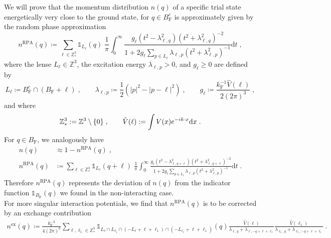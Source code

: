 \documentclass[12pt,a4paper]{article}
\numberwithin{equation}{section}
\newcommand{\1}{\mathbb{I}}
\newcommand{\di}{\textnormal{d}}
\newcommand{\ex}{\mathrm{ex}}
\newcommand{\F}{\mathrm{F}}
\newcommand{\RPA}{\mathrm{RPA}}
\newcommand{\Z}{\mathbb{Z}}
\newcommand{\half}{\frac{1}{2}}
\theoremstyle{plain}
\theoremstyle{definition}
\theoremstyle{remark}
\theoremstyle{plain}
\theoremstyle{definition}
\theoremstyle{remark}
\begin{document}
We will prove that the momentum distribution $ n(q) $ of a specific trial state energetically very close to the ground state, for $ q \in B_{\F}^c $ is approximately given by the random phase approximation
\begin{equation} \label{eq:nqb}
	n^{\RPA}(q)
	\coloneq \sum_{\ell \in \Z^3_*}\mathds{1}_{L_{\ell}}(q) \; \frac{1}{\pi}\int_0^\infty \frac{g_\ell (t^2-\lambda^2_{\ell,q}) (t^2 + \lambda^2_{\ell,q})^{-2}}{1 + 2g_\ell \sum_{p \in L_{\ell}}\lambda_{\ell,p} (t^2+\lambda^2_{\ell,p})^{-1}} \mathrm{d}t \;,
\end{equation}
where the lense $ L_\ell \in \Z^3 $, the excitation energy $ \lambda_{\ell,p} > 0 $, and $ g_\ell \ge 0 $ are defined by
\begin{equation} \label{eq:Lell}
	L_\ell \coloneq B_{\F}^c \cap (B_{\F} + \ell) \;, \qquad
	\lambda_{\ell,p} \coloneq \half (|p|^2 - |p-\ell|^2) \;, \qquad
	g_\ell \coloneq \frac{k_{\F}^{-1} \hat{V}(\ell) }{2 (2 \pi)^3} \;,
\end{equation}
and where \todo{Do we need $\Z^3_*$? Anyway $L_0 = \emptyset$.}
\begin{equation} \label{eq:Fourierconvention}
	\Z^3_* := \Z^3 \setminus \{0\} \;, \qquad
	\hat{V}(\ell) := \int V(x) e^{-i k \cdot x} \di x \;.
\end{equation}
For $ q \in B_{\F} $, we analogously have
\begin{equation}\label{eq:inside}
\begin{split}
	n(q) & \approx 1 - n^{\RPA}(q) \;, \\
	n^{\RPA}(q) & 	\coloneq \sum_{\ell \in \Z^3_*}\mathds{1}_{L_{\ell}}(q+\ell) \; \frac{1}{\pi}\int_0^\infty \frac{g_\ell (t^2-\lambda^2_{\ell,q+\ell}) (t^2 + \lambda^2_{\ell,q+\ell})^{-2}}{1 + 2g_\ell \sum_{p \in L_{\ell}}\lambda_{\ell,p} (t^2+\lambda^2_{\ell,p})^{-1}} \mathrm{d}t \;.
\end{split}
\end{equation}
Therefore $ n^{\RPA}(q) $ represents the deviation of $ n(q) $ from the indicator function $ \mathds{1}_{B_{\F}}(q) $ we found in the non-interacting case.\\
For more singular interaction potentials, we find that $ n^{\RPA}(q) $ is to be corrected by an exchange contribution
\begin{equation} \label{eq:nqex}
\begin{split}
	n^{\ex}(q)
	\coloneq 
	\frac{k_{\F}^{-2}}{4 (2 \pi)^6} \sum_{\ell,\ell_1 \in \Z^3_*}
		\mathds{1}_{L_\ell \cap L_{\ell_1} \cap (-L_{\ell}+\ell+\ell_1) \cap (-L_{\ell_1}+\ell+\ell_1)}(q)
		\frac{\hat{V}(\ell)}{\lambda_{\ell,q} + \lambda_{\ell,-q+\ell+\ell_1}}
		\frac{\hat{V}(\ell_1)}{\lambda_{\ell_1,q} + \lambda_{\ell_1,-q+\ell+\ell_1}} \;.
\end{split}
\end{equation}
\end{document}
